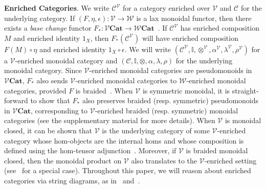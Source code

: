 \vspace{1em}
\noindent
\textbf{Enriched Categories}.
%
We write $\mathcal{C}^{\mathcal{V}}$ for a category enriched over $\mathcal{V}$ and $\mathcal{C}$ for the underlying category.
If $( F, \eta, \epsilon ): \mathcal{V} \to \mathcal{W}$ is a lax monoidal functor, then there exists a \emph{base change} functor $F_{*}: \mathcal{V}\mathbf{Cat} \to \mathcal{W}\mathbf{Cat}$~\cite{Kelly1982}.
If $\mathcal{C}^{\mathcal{V}}$ has enriched composition $M$ and enriched identity $1_X$, then $F_*( \mathcal{C}^{\mathcal{V}} )$ will have enriched composition $F( M ) \circ \eta$ and enriched identity $1_X \circ \epsilon$.
We will write $( \mathcal{C}^{\mathcal{V}}, \mathbb{I}, \otimes^{\mathcal{V}}, \alpha^{\mathcal{V}}, \lambda^{\mathcal{V}}, \rho^{\mathcal{V}} )$ for a $\mathcal{V}$-enriched monoidal category and $( \mathcal{C}, \mathbb{I}, \otimes, \alpha, \lambda, \rho )$ for the underlying monoidal category.
Since $\mathcal{V}$-enriched monoidal categories are pseudomonoids in $\mathcal{V}\mathbf{Cat}$, $F_*$ also sends $\mathcal{V}$-enriched monoidal categories to $\mathcal{W}$-enriched monoidal categories, provided $F$ is braided~\cite{Cruttwell2008}.
When $\mathcal{V}$ is symmetric monoidal, it is straight-forward to show that $F_*$ also preserves braided (resp. symmetric) pseudomonoids in $\mathcal{V}\mathbf{Cat}$, corresponding to $\mathcal{V}$-enriched braided (resp. symmetric) monoidal categories (see the supplementary material for more details).
When $\mathcal{V}$ is monoidal closed, it can be shown that $\mathcal{V}$ is the underlying category of some $\mathcal{V}$-enriched category whose hom-objects are the internal homs and whose composition is defined using the hom-tensor adjunction~\cite{Kelly1982}.
Moreover, if $\mathcal{V}$ is braided monoidal closed, then the monoidal product on $\mathcal{V}$ also translates to the $\mathcal{V}$-enriched setting (see~\cite{10.1093/imrn/rnx217} for a special case).
Throughout this paper, we will reason about enriched categories via string diagrams, as in~\cite{Wesley2024} and~\cite{10.1093/imrn/rnx217}.

